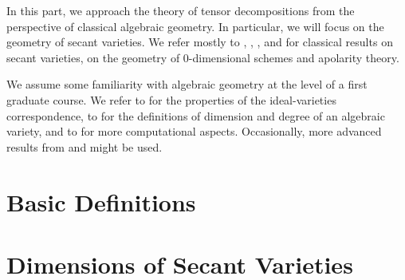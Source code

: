 In this part, we approach the theory of tensor decompositions from the perspective of classical algebraic geometry. In particular, we will focus on the geometry of secant varieties. We refer mostly to \cite{Zak93}, \cite{IK99}, \cite{CGO14}, \cite{Rus16} and \cite{BCCGO18} for classical results on secant varieties, on the geometry of $0$-dimensional schemes and apolarity theory. 

We assume some familiarity with algebraic geometry at the level of a first graduate course. We refer to \cite{Sha94} for the properties of the ideal-varieties correspondence, to \cite{Har92} for the definitions of dimension and degree of an algebraic variety, and to \cite{CLO07} for more computational aspects. Occasionally, more advanced results from \cite{Mum76} and \cite{Vak24} might be used. 

\chapter{Basic Definitions}
\label{geometrySecants-chapter-BasicDefinitions}


\chapter{Dimensions of Secant Varieties}
\label{geometrySecants-chapter-DimensionsSecants}


